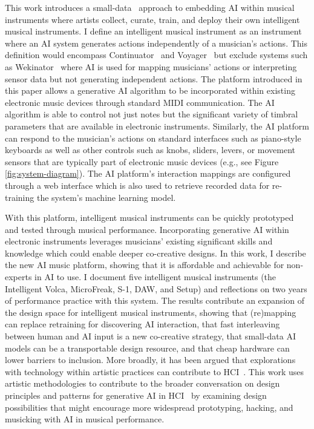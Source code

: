 \documentclass[sigconf]{nimeart}
\begin{document}
This work introduces a small-data~\cite{Vigliensoni:2022} approach to embedding AI within musical instruments where artists collect, curate, train, and deploy their own intelligent musical instruments.
I define an intelligent musical instrument as an instrument where an AI system generates actions independently of a musician's actions.
This definition would encompass Continuator~\cite{Pachet:2003wd} and Voyager~\cite{Lewis:2000fu} but exclude systems such as Wekinator~\cite{fiebrink_meta-instrument_2009} where AI is used for mapping musicians' actions or interpreting sensor data but not generating independent actions.
The platform introduced in this paper allows a generative AI algorithm to be incorporated within existing electronic music devices through standard MIDI communication. 
The AI algorithm is able to control not just notes but the significant variety of timbral parameters that are available in electronic instruments. 
Similarly, the AI platform can respond to the musician's actions on standard interfaces such as piano-style keyboards as well as other controls such as knobs, sliders, levers, or movement sensors that are typically part of electronic music devices (e.g., see Figure \ref{fig:system-diagram}).
The AI platform's interaction mappings are configured through a web interface which is also used to retrieve recorded data for re-training the system's machine learning model.

With this platform, intelligent musical instruments can be quickly prototyped and tested through musical performance.
Incorporating generative AI within electronic instruments leverages musicians' existing significant skills and knowledge which could enable deeper co-creative designs.
In this work, I describe the new AI music platform, showing that it is affordable and achievable for non-experts in AI to use.
I document five intelligent musical instruments (the Intelligent Volca, MicroFreak, S-1, DAW, and Setup) and reflections on two years of performance practice with this system.
The results contribute an expansion of the design space for intelligent musical instruments, showing that (re)mapping can replace retraining for discovering AI interaction, that fast interleaving between human and AI input is a new co-creative strategy, that small-data AI models can be a transportable design resource, and that cheap hardware can lower barriers to inclusion.
More broadly, it has been argued that explorations with technology within artistic practices can contribute to HCI~\cite{improvisation-arts-hci-2018, artistic-narratives-hci, state-of-arts-inchi-2022, interactive-art-hci-2019}.
This work uses artistic methodologies to contribute to the broader conversation on design principles and patterns for generative AI in HCI~\cite{design-principles-genai-2024} by examining design possibilities that might encourage more widespread prototyping, hacking, and musicking with AI in musical performance.
\end{document}
